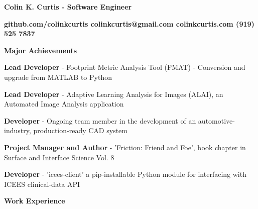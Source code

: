 \documentclass[letterpaper,final]{memoir}
\newcommand{\LargeSep}{\vspace{1.3em}}
\newcommand{\Sep}{\vspace{1.0em}}
\newcommand{\SmallSep}{\vspace{0.4em}}
\newcommand{\CVSection}[1]
	{\LARGE\textbf{#1}\par
	\SmallSep\normalsize}
\newcommand{\CVItem}[1]
	{\textbf{\color{Blue} #1}}
\newcommand\tab[1][1cm]{\hspace*{#1}}
\begin{document}
\Huge \bfseries {\color{Blue} Colin K. Curtis - Software Engineer}

\Sep
\normalsize\normalfont

\CVItem  \tab \bfseries {github.com/colinkcurtis \tab colinkcurtis@gmail.com  \tab colinkcurtis.com \tab  (919) 525 7837}

\LargeSep





\notoserif \CVSection{Major Achievements}
\normalfont

\Sep

\begin{compactitem}

    \item \textbf{Lead Developer} - Footprint Metric Analysis Tool (FMAT) - Conversion and upgrade from MATLAB to Python
    \SmallSep

    \item \textbf{Lead Developer} - Adaptive Learning Analysis for Images (ALAI), an Automated Image Analysis application
    \SmallSep

    \item \textbf{Developer} - Ongoing team member in the development of an automotive-industry, production-ready CAD system
    \SmallSep

    \item \textbf{Project Manager and Author} - 'Friction: Friend and Foe', book chapter in Surface and Interface Science Vol. 8
    \SmallSep

    \item \textbf{Developer} - 'icees-client' a pip-installable Python module for interfacing with ICEES clinical-data API
    \SmallSep



\end{compactitem}

\LargeSep


\notoserif \CVSection{Work Experience}
\normalfont
\end{document}
